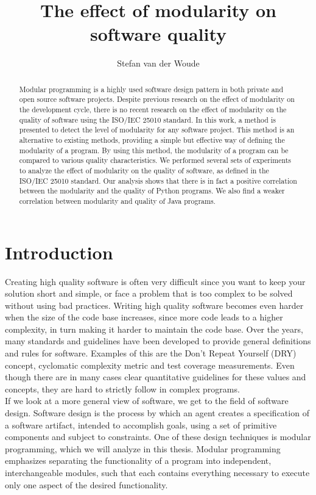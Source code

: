 \documentclass[twoside]{uva-inf-bachelor-thesis}
\title{The effect of modularity on software quality}
\author{Stefan van der Woude}
\begin{document}
\maketitle

\begin{abstract}
Modular programming is a highly used software design pattern in both private and open source software projects. Despite previous research on the effect of modularity on the development cycle, there is no recent research on the effect of modularity on the quality of software using the ISO/IEC 25010 standard. In this work, a method is presented to detect the level of modularity for any software project. This method is an alternative to existing methods, providing a simple but effective way of defining the modularity of a program. By using this method, the modularity of a program can be compared to various quality characteristics. We performed several sets of experiments to analyze the effect of modularity on the quality of software, as defined in the ISO/IEC 25010 standard. Our analysis shows that there is in fact a positive correlation between the modularity and the quality of Python programs. We also find a weaker correlation between modularity and quality of Java programs.
\end{abstract}

\tableofcontents


\chapter{Introduction}
Creating high quality software is often very difficult since you want to keep your solution short and simple, or face a problem that is too complex to be solved without using bad practices. Writing high quality software becomes even harder when the size of the code base increases, since more code leads to a higher complexity\cite{bhatia2014survey}, in turn making it harder to maintain the code base\cite{banker1993software}. Over the years, many standards and guidelines have been developed to provide general definitions and rules for software. Examples of this are the Don't Repeat Yourself (DRY) concept\cite{hunt2000pragmatic}, cyclomatic complexity metric\cite{mccabe1976complexity} and test coverage measurements\cite{miller1963systematic}. Even though there are in many cases clear quantitative guidelines for these values and concepts, they are hard to strictly follow in complex programs.\\

If we look at a more general view of software, we get to the field of software design. Software design is the process by which an agent creates a specification of a software artifact, intended to accomplish goals, using a set of primitive components and subject to constraints\cite{ralph2009proposal}. One of these design techniques is modular programming\cite{barnett1968modular}, which we will analyze in this thesis. Modular programming emphasizes separating the functionality of a program into independent, interchangeable modules, such that each contains everything necessary to execute only one aspect of the desired functionality.
\end{document}
